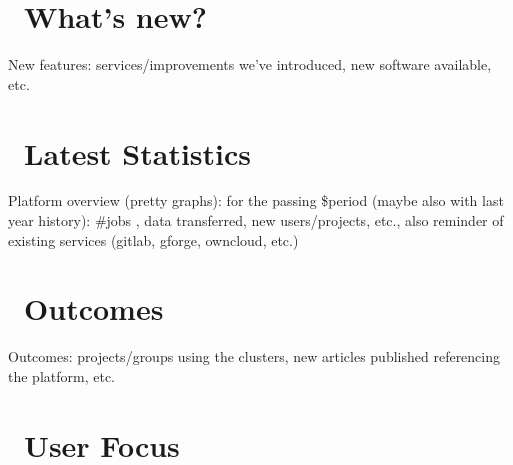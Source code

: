 \documentclass{article}
\begin{document}
\ulhpctoc

\begin{welcome}
  \lipsum[1]
\end{welcome}



\section{\faBullhorn\ What's new?}

New features: services/improvements we've introduced, new software
available, etc.

\section{\faBarChart\ Latest Statistics}

Platform overview (pretty graphs): for the passing \$period (maybe also
with last year history): \#jobs , data transferred,  new users/projects,
etc., also reminder of existing services (gitlab, gforge, owncloud, etc.)

\section{\faShare\ Outcomes}

Outcomes: projects/groups using the clusters, new articles published
referencing the platform, etc.

\section{\faUser\ User Focus}
\end{document}
